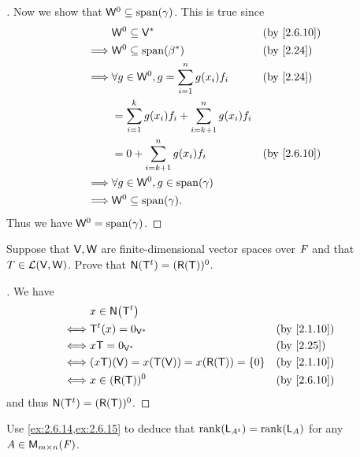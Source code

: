 \begin{proof}[]
	Now we show that \(\W^0 \subseteq \spn{\gamma}\).
	This is true since
	\begin{align*}
		         & \W^0 \subseteq \V^*                                         &  & \by{2.6.10} \\
		\implies & \W^0 \subseteq \spn{\beta^*}                                &  & \by{2.24}   \\
		\implies & \forall g \in \W^0, g = \sum_{i = 1}^n g(x_i) f_i           &  & \by{2.24}   \\
		         & = \sum_{i = 1}^k g(x_i) f_i + \sum_{i = k + 1}^n g(x_i) f_i                  \\
		         & = 0 + \sum_{i = k + 1}^n g(x_i) f_i                         &  & \by{2.6.10} \\
		\implies & \forall g \in \W^0, g \in \spn{\gamma}                                       \\
		\implies & \W^0 \subseteq \spn{\gamma}.
	\end{align*}
	Thus we have \(\W^0 = \spn{\gamma}\).
\end{proof}

\begin{ex}\label{ex:2.6.15}
	Suppose that \(\mathsf{V}, \mathsf{W}\) are finite-dimensional vector spaces over \(\mathit{F}\) and that \(T \in \mathcal{L}(\mathsf{V}, \mathsf{W})\).
	Prove that \(\ns{\tp{\T}} = (\rg{\T})^0\).
\end{ex}

\begin{proof}[]
	We have
	\begin{align*}
		     & x \in \ns{\tp{\T}}                                             \\
		\iff & \tp{\T}(x) = 0_{\V^*}                         &  & \by{2.1.10} \\
		\iff & x \T = 0_{\V^*}                               &  & \by{2.25}   \\
		\iff & (x \T)(\V) = x(\T(\V)) = x(\rg{\T}) = \set{0} &  & \by{2.1.10} \\
		\iff & x \in (\rg{\T})^0                             &  & \by{2.6.10}
	\end{align*}
	and thus \(\ns{\tp{\T}} = (\rg{\T})^0\).
\end{proof}

\begin{ex}\label{ex:2.6.16}
	Use \cref{ex:2.6.14,ex:2.6.15} to deduce that \(\rk{\L_{\tp{A}}} = \rk{\L_A}\) for any \(A \in \mathsf{M}_{{m} \times n}({\mathit{F}})\).
\end{ex}

